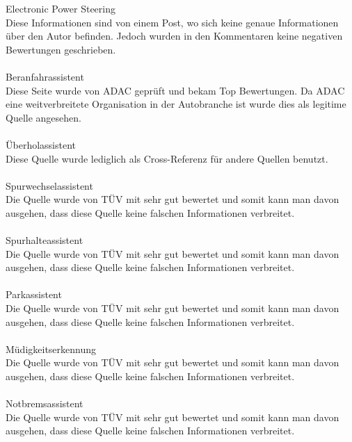 Electronic Power Steering \cite{PSCU.PB1}\\
Diese Informationen sind von einem Post, wo sich keine genaue Informationen über den Autor befinden. Jedoch wurden in den Kommentaren keine negativen Bewertungen geschrieben.\\\\

Beranfahrassistent \cite{berganfahr.PB1}\\
Diese Seite wurde von ADAC geprüft und bekam Top Bewertungen. Da ADAC eine weitverbreitete Organisation in der Autobranche ist wurde dies als legitime Quelle angesehen.\\\\

Überholassistent \cite{ueberholassi.PB1}\\
Diese Quelle wurde lediglich als Cross-Referenz für andere Quellen benutzt.\\\\

Spurwechselassistent \cite{spurwechsel.PB1}\\
Die Quelle wurde von TÜV mit sehr gut bewertet und somit kann man davon ausgehen, dass diese Quelle keine falschen Informationen verbreitet.\\\\

Spurhalteassistent \cite{spurhalte.PB1}\\
Die Quelle wurde von TÜV mit sehr gut bewertet und somit kann man davon ausgehen, dass diese Quelle keine falschen Informationen verbreitet.\\\\

Parkassistent \cite{parkassi.PB1}\\
Die Quelle wurde von TÜV mit sehr gut bewertet und somit kann man davon ausgehen, dass diese Quelle keine falschen Informationen verbreitet.\\\\

Müdigkeitserkennung \cite{muedigkeitsassi.PB1}\\
Die Quelle wurde von TÜV mit sehr gut bewertet und somit kann man davon ausgehen, dass diese Quelle keine falschen Informationen verbreitet.\\\\

Notbremsassistent \cite{notbremsassi.PB1}\\
Die Quelle wurde von TÜV mit sehr gut bewertet und somit kann man davon ausgehen, dass diese Quelle keine falschen Informationen verbreitet.\\\\

